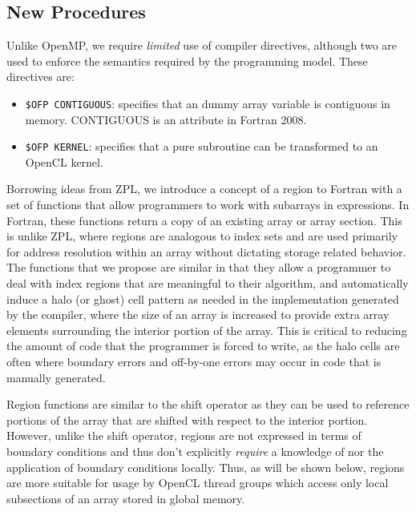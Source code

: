 \subsection{New Procedures}

Unlike OpenMP, we require \emph{limited} use of compiler directives, although
two are used to enforce the semantics required by the programming
model.  These directives are:

\begin{itemize}

\item {\tt \!\$OFP CONTIGUOUS}: specifies that an dummy array variable is
  contiguous in memory. CONTIGUOUS is an attribute in Fortran 2008.

\item {\tt \!\$OFP KERNEL}: specifies that a pure subroutine can be
  transformed to an OpenCL kernel.

\end{itemize}

Borrowing ideas from ZPL, we introduce a concept of a region to
Fortran with a set of functions that allow programmers to work with
subarrays in expressions.  In Fortran, these functions return a copy
of an existing array or array section.  This is unlike ZPL, where
regions are analogous to index sets and are used primarily for address
resolution within an array without dictating storage related behavior.
The functions that we propose are similar in that they allow a
programmer to deal with index regions that are meaningful to their
algorithm, and automatically induce a halo (or ghost) cell pattern as
needed in the implementation generated by the compiler, where the size
of an array is increased to provide extra array elements surrounding
the interior portion of the array.  This is critical to reducing the
amount of code that the programmer is forced to write, as the halo cells
are often where boundary errors and off-by-one errors may occur in code
that is manually generated.

Region functions are similar to the shift operator as they can be used
to reference portions of the array that are shifted with respect to
the interior portion.  However, unlike the shift operator, regions are
not expressed in terms of boundary conditions and thus don't
explicitly \emph{require} a knowledge of nor the application of
boundary conditions locally.  Thus, as will be shown below, regions
are more suitable for usage by OpenCL thread groups which access only
local subsections of an array stored in global memory.

